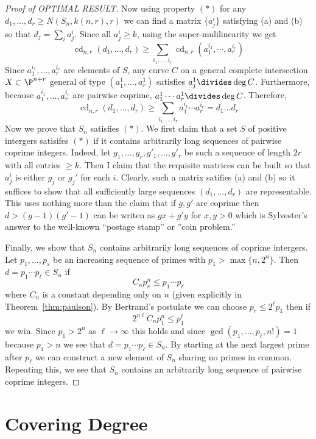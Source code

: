 \documentclass[12pt]{article}
\DeclareMathOperator{\cd}{\text{cd}}
\begin{document}
\begin{proof}[Proof of OPTIMAL RESULT]
\par
Now using property $(\ast)$ for any $d_1, \dots, d_r \ge N(S_n, k(n,r), r)$ we can find a matrix $\{ a^i_j \}$ satisfying (a) and (b) so that $d_j = \sum_i a^i_j$. Since all $a^i_j \ge k$, using the super-mulilinearity we get
\[ \cd_{n,r}(d_1, \dots, d_r) \ge \sum_{i_1, \dots, i_r} \cd_{n,r}(a_1^{i_1}, \cdots, a_r^{i_r}) \]
Since $a_1^{i_1}, \dots, a^{i_r}_r$ are elements of $S$, any curve $C$ on a general complete intersection $X \subset \P^{n+r}$ general of type $(a^1_1, \dots, a^1_r)$ satisfies $a^1_j \divides \deg{C}$. Furthermore, because $a_1^{i_1}, \dots, a^{i_r}_r$ are pairwise coprime, $a^1_1 \cdots a^1_r \divides \deg{C}$. Therefore,
\[ \cd_{n,r}(d_1, \dots, d_r) \ge \sum_{i_1, \dots, i_r} a_1^{i_1} \cdots a_r^{i_r} = d_1 \dots d_r \]
Now we prove that $S_n$ satisfies $(\ast)$. We first claim that a set $S$ of positive intergers satisifes $(\ast)$ if it contains arbitrarily long sequences of pairwise coprime integers. Indeed, let $g_1, \dots, g_r, g'_1, \dots, g'_r$ be such a sequence of length $2r$ with all entries $\ge k$. Then I claim that the requisite matrices can be built so that $a_j^i$ is either $g_j$ or $g_j'$ for each $i$. Clearly, such a matrix satifies (a) and (b) so it suffices to show that all sufficiently large sequences $(d_1, \dots, d_r)$ are representable. This uses nothing more than the claim that if $g,g'$ are coprime then $d > (g-1)(g'-1)$ can be writen as $g x + g' y$ for $x,y > 0$ which is  Sylvester's answer to the well-known ``postage stamp'' or ''coin problem.''
\par
Finally, we show that $S_n$ contains arbitrarily long sequences of coprime intergers. Let $p_1, \dots, p_s$ be an increasing sequence of primes with $p_1 > \max \{n, 2^n \}$. Then $d = p_1 \cdots p_\ell \in S_n$ if 
\[ C_n p_r^n \le p_1 \cdots p_\ell \]
where $C_n$ is a constant depending only on $n$ (given explicitly in Theorem~\ref{thm:paulson}). By Bertrand's postulate we can choose $p_r \le 2^\ell p_1$ then  if
\[ 2^{n\ell} C_n p_1^n \le p_1^\ell \]
we win. Since $p_1 > 2^n$ as $\ell \to \infty$ this holds and since $\gcd(p_1, \dots, p_{\ell}, n!) = 1$ because $p_1 > n$ we see that $d = p_1 \cdots p_{\ell} \in S_n$. By starting at the next largest prime after $p_{\ell}$ we can construct a new element of $S_n$ sharing no primes in common. Repeating this, we see that $S_n$ contains an arbitrarily long sequence of pairwise coprime integers. 
\end{proof}

\section{Covering Degree}
\end{document}
